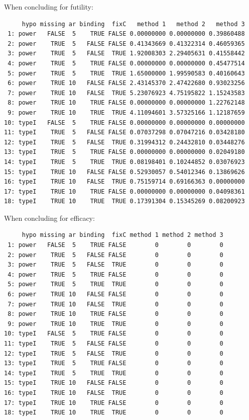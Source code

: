 \documentclass[12pt]{article}
\begin{document}
When concluding for futility:
\begin{verbatim}
     hypo missing ar binding  fixC   method 1   method 2   method 3
 1: power   FALSE  5    TRUE FALSE 0.00000000 0.00000000 0.39860488
 2: power    TRUE  5   FALSE FALSE 0.41343669 0.41322314 0.46059365
 3: power    TRUE  5   FALSE  TRUE 1.92008303 2.29405631 0.41558442
 4: power    TRUE  5    TRUE FALSE 0.00000000 0.00000000 0.45477514
 5: power    TRUE  5    TRUE  TRUE 1.65000000 1.99590583 0.40160643
 6: power    TRUE 10   FALSE FALSE 2.43145370 2.47422680 0.93023256
 7: power    TRUE 10   FALSE  TRUE 5.23076923 4.75195822 1.15243583
 8: power    TRUE 10    TRUE FALSE 0.00000000 0.00000000 1.22762148
 9: power    TRUE 10    TRUE  TRUE 4.11094601 3.57325166 1.12187659
10: typeI   FALSE  5    TRUE FALSE 0.00000000 0.00000000 0.00000000
11: typeI    TRUE  5   FALSE FALSE 0.07037298 0.07047216 0.03428180
12: typeI    TRUE  5   FALSE  TRUE 0.31994312 0.24432810 0.03448276
13: typeI    TRUE  5    TRUE FALSE 0.00000000 0.00000000 0.02049180
14: typeI    TRUE  5    TRUE  TRUE 0.08198401 0.10244852 0.03076923
15: typeI    TRUE 10   FALSE FALSE 0.52930057 0.54012346 0.13869626
16: typeI    TRUE 10   FALSE  TRUE 0.75159714 0.69166363 0.00000000
17: typeI    TRUE 10    TRUE FALSE 0.00000000 0.00000000 0.04098361
18: typeI    TRUE 10    TRUE  TRUE 0.17391304 0.15345269 0.08200923
\end{verbatim}

When concluding for efficacy:
\begin{verbatim}
     hypo missing ar binding  fixC method 1 method 2 method 3
 1: power   FALSE  5    TRUE FALSE        0        0        0
 2: power    TRUE  5   FALSE FALSE        0        0        0
 3: power    TRUE  5   FALSE  TRUE        0        0        0
 4: power    TRUE  5    TRUE FALSE        0        0        0
 5: power    TRUE  5    TRUE  TRUE        0        0        0
 6: power    TRUE 10   FALSE FALSE        0        0        0
 7: power    TRUE 10   FALSE  TRUE        0        0        0
 8: power    TRUE 10    TRUE FALSE        0        0        0
 9: power    TRUE 10    TRUE  TRUE        0        0        0
10: typeI   FALSE  5    TRUE FALSE        0        0        0
11: typeI    TRUE  5   FALSE FALSE        0        0        0
12: typeI    TRUE  5   FALSE  TRUE        0        0        0
13: typeI    TRUE  5    TRUE FALSE        0        0        0
14: typeI    TRUE  5    TRUE  TRUE        0        0        0
15: typeI    TRUE 10   FALSE FALSE        0        0        0
16: typeI    TRUE 10   FALSE  TRUE        0        0        0
17: typeI    TRUE 10    TRUE FALSE        0        0        0
18: typeI    TRUE 10    TRUE  TRUE        0        0        0
\end{verbatim}
\end{document}

